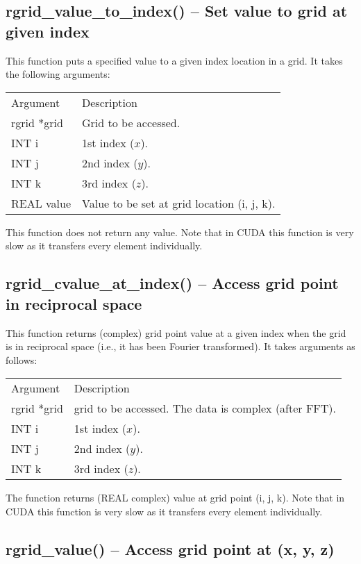 \documentclass[12pt,letterpaper]{report}
\begin{document}
\subsection{rgrid\_value\_to\_index() -- Set value to grid at given index}

This function puts a specified value to a given index location in a grid. It takes the following arguments:
\begin{longtable}{p{} p{}}
Argument & Description\\
\cline{1-2}
rgrid *grid & Grid to be accessed.\\
INT i & 1st index ($x$).\\
INT j & 2nd index ($y$).\\
INT k & 3rd index ($z$).\\
REAL value & Value to be set at grid location (i, j, k).\\
\end{longtable}
\noindent
This function does not return any value. Note that in CUDA this function is very slow as it transfers every element individually.

\subsection{rgrid\_cvalue\_at\_index() -- Access grid point in reciprocal space}

This function returns (complex) grid point value at a given index when the grid is in reciprocal space (i.e., it has been Fourier transformed). It takes arguments as follows:
\begin{longtable}{p{} p{}}
Argument & Description\\
\cline{1-2}
rgrid *grid & grid to be accessed. The data is complex (after FFT).\\
INT i & 1st index ($x$).\\
INT j & 2nd index ($y$).\\
INT k & 3rd index ($z$).\\
\end{longtable}
\noindent
The function returns (REAL complex) value at grid point (i, j, k). Note that in CUDA this function is very slow as it transfers every element individually.

\subsection{rgrid\_value() -- Access grid point at (x, y, z)}
\end{document}
